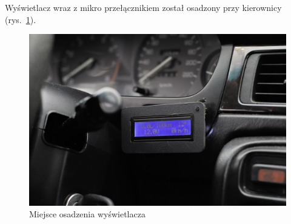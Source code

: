 \par Wyświetlacz wraz z mikro przełącznikiem został osadzony przy kierownicy (rys.~\ref{fig:arduino_lcd}).
\begin{figure}[!h]
\centering
\includegraphics[width=0.8\linewidth]{Rysunki/arduino_lcd.jpg}
\caption{Miejsce osadzenia wyświetlacza}
\label{fig:arduino_lcd}
\end{figure}
